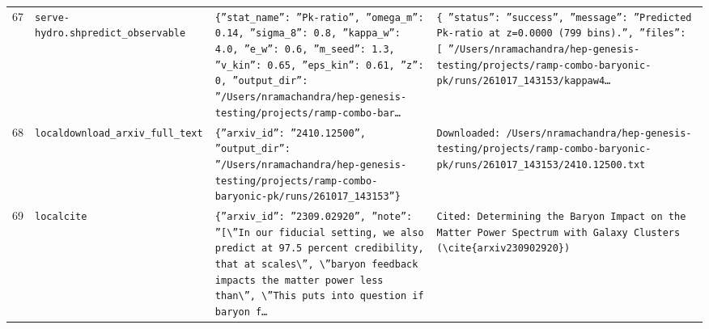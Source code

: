 \documentclass[11pt,a4paper]{article}
\begin{document}
\begin{longtable}{@{}p{}p{}p{}p{}@{}}
67 & \texttt{serve-hydro.sh}\newline\texttt{predict\_\allowbreak{}observable} & \texttt{\{''stat\_\allowbreak{}name'':\allowbreak{} ''Pk-ratio'',\allowbreak{} ''omega\_\allowbreak{}m'':\allowbreak{} 0.14,\allowbreak{} ''sigma\_\allowbreak{}8'':\allowbreak{} 0.8,\allowbreak{} ''kappa\_\allowbreak{}w'':\allowbreak{} 4.0,\allowbreak{} ''e\_\allowbreak{}w'':\allowbreak{} 0.6,\allowbreak{} ''m\_\allowbreak{}seed'':\allowbreak{} 1.3,\allowbreak{} ''v\_\allowbreak{}kin'':\allowbreak{} 0.65,\allowbreak{} ''eps\_\allowbreak{}kin'':\allowbreak{} 0.61,\allowbreak{} ''z'':\allowbreak{} 0,\allowbreak{} ''output\_\allowbreak{}dir'':\allowbreak{} ''/\allowbreak{}Users/\allowbreak{}nramachandra/\allowbreak{}hep-genesis-testing/\allowbreak{}projects/\allowbreak{}ramp-combo-bar\ldots{}\allowbreak{}} & \texttt{\{   ''status'':\allowbreak{} ''success'',\allowbreak{}   ''message'':\allowbreak{} ''Predicted Pk-ratio at z=\allowbreak{}0.0000 (799 bins)\allowbreak{}.'',\allowbreak{}   ''files'':\allowbreak{} [     ''/\allowbreak{}Users/\allowbreak{}nramachandra/\allowbreak{}hep-genesis-testing/\allowbreak{}projects/\allowbreak{}ramp-combo-baryonic-pk/\allowbreak{}runs/\allowbreak{}261017\_\allowbreak{}143153/\allowbreak{}kappaw4\ldots{}\allowbreak{}} \\
68 & \texttt{local}\newline\texttt{download\_\allowbreak{}arxiv\_\allowbreak{}full\_\allowbreak{}text} & \texttt{\{''arxiv\_\allowbreak{}id'':\allowbreak{} ''2410.12500'',\allowbreak{} ''output\_\allowbreak{}dir'':\allowbreak{} ''/\allowbreak{}Users/\allowbreak{}nramachandra/\allowbreak{}hep-genesis-testing/\allowbreak{}projects/\allowbreak{}ramp-combo-baryonic-pk/\allowbreak{}runs/\allowbreak{}261017\_\allowbreak{}143153''\}\allowbreak{}} & \texttt{Downloaded:\allowbreak{} /\allowbreak{}Users/\allowbreak{}nramachandra/\allowbreak{}hep-genesis-testing/\allowbreak{}projects/\allowbreak{}ramp-combo-baryonic-pk/\allowbreak{}runs/\allowbreak{}261017\_\allowbreak{}143153/\allowbreak{}2410.12500.txt} \\
69 & \texttt{local}\newline\texttt{cite} & \texttt{\{''arxiv\_\allowbreak{}id'':\allowbreak{} ''2309.02920'',\allowbreak{} ''note'':\allowbreak{} ''[\textbackslash{}\allowbreak{}''In our fiducial setting,\allowbreak{} we also predict at 97.5 percent credibility,\allowbreak{} that at scales\textbackslash{}\allowbreak{}'',\allowbreak{} \textbackslash{}\allowbreak{}''baryon feedback impacts the matter power less than\textbackslash{}\allowbreak{}'',\allowbreak{} \textbackslash{}\allowbreak{}''This puts into question if baryon f\ldots{}\allowbreak{}} & \texttt{Cited:\allowbreak{} Determining the Baryon Impact on the Matter Power Spectrum with Galaxy Clusters (\textbackslash{}\allowbreak{}cite\{arxiv230902920\}\allowbreak{})\allowbreak{}} \\

\end{longtable}
\end{document}
